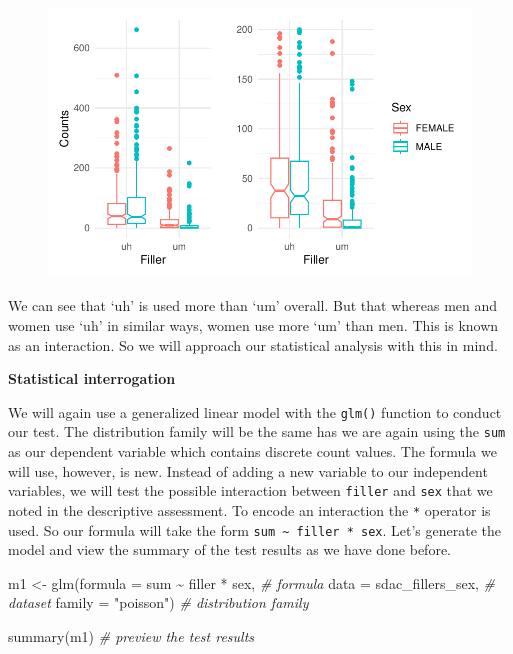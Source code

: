 \documentclass[
  letterpaper,
]{latex/krantz}
\newenvironment{Shaded}{\begin{snugshade}}{\end{snugshade}}
\newcommand{\AttributeTok}[1]{\textcolor[rgb]{0.00,0.00,0.00}{#1}}
\newcommand{\CommentTok}[1]{\textcolor[rgb]{0.00,0.00,0.00}{\textit{#1}}}
\newcommand{\FunctionTok}[1]{\textcolor[rgb]{0.00,0.00,0.00}{#1}}
\newcommand{\NormalTok}[1]{\textcolor[rgb]{0.00,0.00,0.00}{#1}}
\newcommand{\OtherTok}[1]{\textcolor[rgb]{0.00,0.00,0.00}{#1}}
\newcommand{\SpecialCharTok}[1]{\textcolor[rgb]{0.00,0.00,0.00}{#1}}
\newcommand{\StringTok}[1]{\textcolor[rgb]{0.00,0.00,0.00}{#1}}
\begin{document}
\begin{figure}[h]

{\centering \includegraphics{inference_files/figure-pdf/i-mulit-cont-visual-1.pdf}

}

\end{figure}

We can see that `uh' is used more than `um' overall. But that whereas
men and women use `uh' in similar ways, women use more `um' than men.
This is known as an interaction. So we will approach our statistical
analysis with this in mind.

\textbf{Statistical interrogation}

We will again use a generalized linear model with the \texttt{glm()}
function to conduct our test. The distribution family will be the same
has we are again using the \texttt{sum} as our dependent variable which
contains discrete count values. The formula we will use, however, is
new. Instead of adding a new variable to our independent variables, we
will test the possible interaction between \texttt{filler} and
\texttt{sex} that we noted in the descriptive assessment. To encode an
interaction the \texttt{*} operator is used. So our formula will take
the form \texttt{sum\ \textasciitilde{}\ filler\ *\ sex}. Let's generate
the model and view the summary of the test results as we have done
before.

\begin{Shaded}
\begin{Highlighting}[]
\NormalTok{m1 }\OtherTok{\textless{}{-}} 
  \FunctionTok{glm}\NormalTok{(}\AttributeTok{formula =}\NormalTok{ sum }\SpecialCharTok{\textasciitilde{}}\NormalTok{ filler }\SpecialCharTok{*}\NormalTok{ sex, }\CommentTok{\# formula}
      \AttributeTok{data =}\NormalTok{ sdac\_fillers\_sex, }\CommentTok{\# dataset}
      \AttributeTok{family =} \StringTok{"poisson"}\NormalTok{) }\CommentTok{\# distribution family}

\FunctionTok{summary}\NormalTok{(m1) }\CommentTok{\# preview the test results}
\end{Highlighting}
\end{Shaded}
\end{document}
